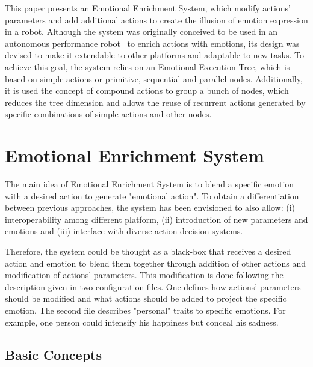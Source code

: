 \documentclass{sig-alternate-05-2015}
\begin{document}
This paper presents an Emotional Enrichment System, which modify actions' parameters and add additional actions to create the illusion of emotion expression in a robot. Although the system was originally conceived to be used in an autonomous performance robot~\cite{angel2013} to enrich actions with emotions, its design was devised to make it extendable to other platforms and adaptable to new tasks. To achieve this goal, the system relies on an Emotional Execution Tree, which is based on simple actions or primitive, sequential and parallel nodes. Additionally, it is used the concept of compound actions to group a bunch of nodes, which reduces the tree dimension and allows the reuse of recurrent actions  generated by specific combinations of simple actions and other nodes.

\section{Emotional Enrichment System}

The main idea of Emotional Enrichment System is to blend a specific emotion with a desired action to generate "emotional action". To obtain a differentiation between previous approaches, the system has been envisioned to also allow: (i) interoperability among different platform, (ii) introduction of new parameters and emotions and (iii) interface with diverse action decision systems.

Therefore, the system could be thought as a black-box that receives a desired action and emotion to blend them together through addition of other actions and modification of actions' parameters. This modification is done following the description given in two configuration files. One defines how actions' parameters should be modified and what actions should be added to project the specific emotion. The second file describes "personal" traits to specific emotions. For example, one person could intensify his happiness but conceal his sadness. 

\subsection{Basic Concepts}
\end{document}
